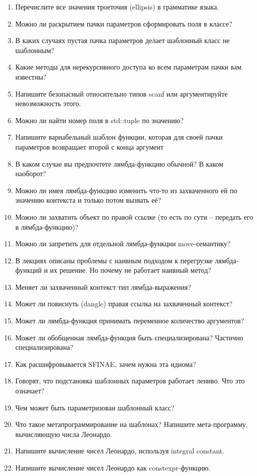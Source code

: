 \documentclass[a4paper,12pt,oneside]{article}
\begin{document}
\begin{enumerate}
\item Перечислите все значения троеточия (ellipsis) в грамматике языка.
\item Можно ли раскрытием пачки параметров сформировать поля в классе?
\item В каких случаях пустая пачка параметров делает шаблонный класс не шаблонным?
\item Какие методы для нерекурсивного доступа ко всем параметрам пачки вам известны?
\item Напишите безопасный относительно типов scanf или аргументируйте невозможность этого.
\item Можно ли найти номер поля в std::tuple по значению?
\item Напишите вариабельный шаблон функции, которая для своей пачки параметров возвращает второй с конца аргумент
\item В каком случае вы предпочтете лямбда-функцию обычной? В каком наоборот?
\item Можно ли имея лямбда-функцию изменить что-то из захваченного ей по значению контекста и только потом вызвать её?
\item Можно ли захватить объект по правой ссылке (то есть по сути -- передать его в лямбда-функцию)?
\item Можно ли запретить для отдельной лямбда-функции move-семантику?
\item В лекциях описаны проблемы с наивным подходом к перегрузке лямбда-функций и их решение. Но почему не работает наивный метод?
\item Меняет ли захваченный контекст тип лямбда-выражения?
\item Может ли повиснуть (dangle) правая ссылка на захваченный контекст?
\item Может ли лямбда-функция принимать переменное количество аргументов?
\item Может ли обобщенная лямбда-функция быть специализирована? Частично специализирована?
\item Как расшифровывается SFINAE, зачем нужна эта идиома?
\item Говорят, что подстановка шаблонных параметров работает лениво. Что это означает?
\item Чем может быть параметризован шаблонный класс?
\item Что такое метапрограммирование на шаблонах? Напишите мета-программу, вычисляющую числа Леонардо.
\item Напишите вычисление чисел Леонардо, используя integral constant.
\item Напишите вычисление чисел Леонардо как constexpr-функцию.

\end{enumerate}
\end{document}
